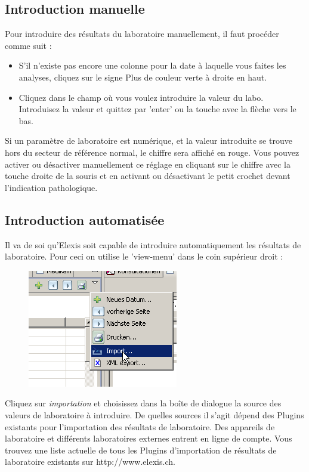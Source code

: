 \subsection{Introduction manuelle}
Pour introduire des résultats du laboratoire manuellement, il faut procéder comme suit :
\begin{itemize}
    \item S'il n'existe pas encore une colonne pour la date à laquelle vous faites les analyses, cliquez sur le signe Plus de couleur verte à droite en haut.
    \item Cliquez dans le champ où vous voulez introduire la valeur du labo. Introduisez la valeur et quittez par 'enter' ou la touche avec la flèche vers le bas.
\end{itemize}
Si un paramètre de laboratoire est numérique, et la valeur introduite se trouve hors du secteur de référence normal, le chiffre sera affiché en rouge. Vous pouvez activer ou désactiver manuellement ce réglage en cliquant sur le chiffre avec la touche droite de la souris et en activant ou désactivant le petit crochet devant l'indication  \glqq pathologique\grqq{}.

\subsection{Introduction automatisée}
Il va de soi qu'Elexis soit capable de introduire automatiquement les résultats de laboratoire. Pour ceci on utilise le 'view-menu' dans le coin supérieur droit :\\
\begin{figure}
    \includegraphics{images/labor6}
\end{figure}
Cliquez sur  \textit{importation} et choisissez dans la boîte de dialogue la source des valeurs de laboratoire à introduire. De quelles sources il s'agit dépend des Plugins existants pour l'importation des résultats de laboratoire.
Des appareils de laboratoire et différents laboratoires externes entrent en ligne de compte. Vous trouvez une liste actuelle de tous les Plugins d'importation de résultats de laboratoire existants sur
http://www.elexis.ch.

